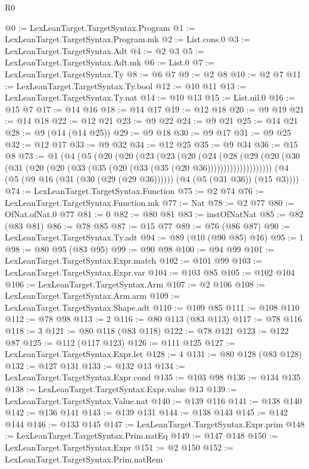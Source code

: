 \begin{lexlean}{R0}
\begin{coremodule}
@0 := LexLeanTarget.TargetSyntax.Program
@1 := LexLeanTarget.TargetSyntax.Program.mk
@2 := List.cons.{0}
@3 := LexLeanTarget.TargetSyntax.Adt
@4 := @2 @3
@5 := LexLeanTarget.TargetSyntax.Adt.mk
@6 := List.{0}
@7 := LexLeanTarget.TargetSyntax.Ty
@8 := @6 @7
@9 := @2 @8
@10 := @2 @7
@11 := LexLeanTarget.TargetSyntax.Ty.bool
@12 := @10 @11
@13 := LexLeanTarget.TargetSyntax.Ty.nat
@14 := @10 @13
@15 := List.nil.{0}
@16 := @15 @7
@17 := @14 @16
@18 := @14 @17
@19 := @12 @18
@20 := @9 @19
@21 := @14 @18
@22 := @12 @21
@23 := @9 @22
@24 := @9 @21
@25 := @14 @21
@28 := @9 (@14 (@14 @25))
@29 := @9 @18
@30 := @9 @17
@31 := @9 @25
@32 := @12 @17
@33 := @9 @32
@34 := @12 @25
@35 := @9 @34
@36 := @15 @8
@73 := @1
    (@4
      (@5
        (@20
          (@20
            (@23
              (@23
                (@20
                  (@24
                    (@28
                      (@29
                        (@20
                          (@30 (@31 (@20 (@20 (@33 (@35 (@20 (@33 (@35 (@20 @36))))))))))))))))))))
      (@4 (@5 (@9 @16 (@31 (@30 (@29 (@29 @36)))))) (@4 (@5 (@31 @36)) (@15 @3))))
@74 := LexLeanTarget.TargetSyntax.Function
@75 := @2 @74
@76 := LexLeanTarget.TargetSyntax.Function.mk
@77 := Nat
@78 := @2 @77
@80 := OfNat.ofNat.{0} @77
@81 := 0
@82 := @80 @81
@83 := instOfNatNat
@85 := @82 (@83 @81)
@86 := @78 @85
@87 := @15 @77
@89 := @76 (@86 @87)
@90 := LexLeanTarget.TargetSyntax.Ty.adt
@94 := @89 (@10 (@90 @85) @16)
@95 := 1
@98 := @80 @95 (@83 @95)
@99 := @90 @98
@100 := @94 @99
@101 := LexLeanTarget.TargetSyntax.Expr.match
@102 := @101 @99
@103 := LexLeanTarget.TargetSyntax.Expr.var
@104 := @103 @85
@105 := @102 @104
@106 := LexLeanTarget.TargetSyntax.Arm
@107 := @2 @106
@108 := LexLeanTarget.TargetSyntax.Arm.arm
@109 := LexLeanTarget.TargetSyntax.Shape.adt
@110 := @109 @85
@111 := @108 @110
@112 := @78 @98
@113 := 2
@116 := @80 @113 (@83 @113)
@117 := @78 @116
@118 := 3
@121 := @80 @118 (@83 @118)
@122 := @78 @121
@123 := @122 @87
@125 := @112 (@117 @123)
@126 := @111 @125
@127 := LexLeanTarget.TargetSyntax.Expr.let
@128 := 4
@131 := @80 @128 (@83 @128)
@132 := @127 @131
@133 := @132 @13
@134 := LexLeanTarget.TargetSyntax.Expr.cond
@135 := @103 @98
@136 := @134 @135
@138 := LexLeanTarget.TargetSyntax.Expr.value @13
@139 := LexLeanTarget.TargetSyntax.Value.nat
@140 := @139 @116
@141 := @138 @140
@142 := @136 @141
@143 := @139 @131
@144 := @138 @143
@145 := @142 @144
@146 := @133 @145
@147 := LexLeanTarget.TargetSyntax.Expr.prim
@148 := LexLeanTarget.TargetSyntax.Prim.natEq
@149 := @147 @148
@150 := LexLeanTarget.TargetSyntax.Expr
@151 := @2 @150
@152 := LexLeanTarget.TargetSyntax.Prim.natRem

\end{coremodule}
\end{lexlean}

